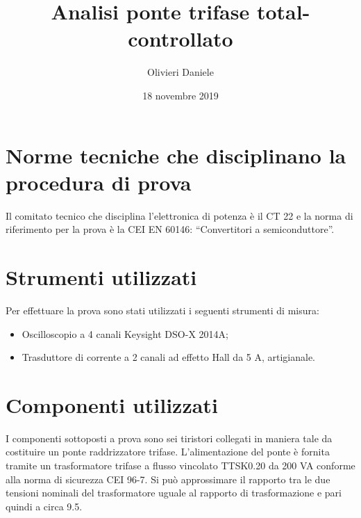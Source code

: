 \documentclass[a4paper,11pt]{article}
\title{Analisi ponte trifase total-controllato}
\author{Olivieri Daniele}
\date{18 novembre 2019}
\begin{document}
\maketitle

\begin{abstract}

\end{abstract}

\section{Norme tecniche che disciplinano la procedura di prova}
Il comitato tecnico che disciplina l'elettronica di potenza è il CT 22 e la norma
di riferimento per la prova è la CEI EN 60146: ``Convertitori a semiconduttore''.

\section{Strumenti utilizzati}
Per effettuare la prova sono stati utilizzati i seguenti strumenti di misura:
\begin{itemize}
 \item Oscilloscopio a 4 canali Keysight DSO-X 2014A;
 \item Trasduttore di corrente a 2 canali ad effetto Hall da 5 A, artigianale.
\end{itemize}

\section{Componenti utilizzati}
I componenti sottoposti a prova sono sei tiristori collegati in maniera tale da
costituire un ponte raddrizzatore trifase.
L'alimentazione del ponte è fornita tramite un trasformatore trifase a flusso vincolato 
TTSK0.20 da 200 VA conforme alla norma di sicurezza CEI 96-7.
Si può approssimare il rapporto tra le due tensioni nominali del trasformatore uguale al 
rapporto di trasformazione e pari quindi a circa 9.5.
\end{document}

